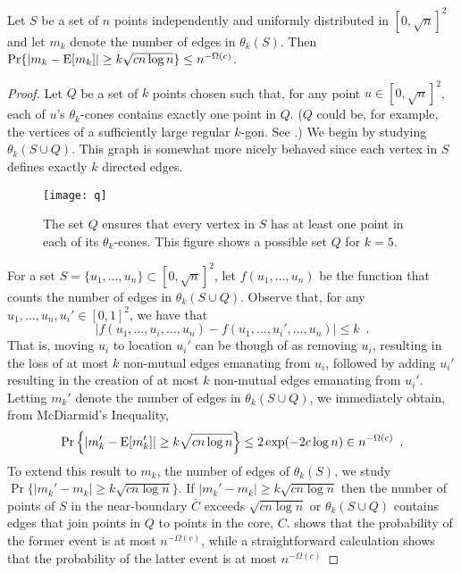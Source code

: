 \documentclass{patmorin}
\begin{document}
\begin{lem}
 Let $S$ be a set of $n$ points independently and uniformly distributed
 in $[0,\sqrt{n}]^2$ and let $m_k$ denote the number of edges in $\theta_k(S)$.
 Then $\Pr\{|m_k-\mathrm{E}[m_k]| \ge k\sqrt{cn\log n}\} \le n^{-\Omega(c)}$.
\end{lem}

\begin{proof}
Let $Q$ be a set of $k$ points chosen such that, for any point
$u\in[0,\sqrt{n}]^2$, each of $u$'s $\theta_k$-cones contains exactly
one point in $Q$. ($Q$ could be, for example, the vertices of a
sufficiently large regular $k$-gon. See .)  We begin by studying
$\theta_k(S\cup Q)$.  This graph is somewhat more nicely behaved since
each vertex in $S$ defines exactly $k$ directed edges.

\begin{figure}
  \begin{center}
    \texttt{[image: q]}
  \end{center}
  \caption{The set $Q$ ensures that every vertex in $S$ has at least
    one point in each of its $\theta_k$-cones.  This figure shows a
    possible set $Q$ for $k=5$.}
\end{figure}

For a set $S=\{u_1,\ldots,u_n\}\subset [0,\sqrt{n}]^2$, let
$f(u_1,\ldots,u_n)$ be the function that counts the number of edges
in $\theta_k(S\cup Q)$.  Observe that, for any $u_1,\ldots,u_n,u_i'\in
[0,1]^2$, we have that
\[
   |f(u_1,\ldots,u_i,\ldots,u_n)-f(u_1,\ldots,u_i',\ldots,u_n)| \le k \enspace .
\]
That is, moving $u_i$ to location $u_i'$ can be though of as removing
$u_i$, resulting in the loss of at most $k$ non-mutual edges emanating
from $u_i$, followed by adding $u_i'$ resulting in the creation of at
most $k$ non-mutual edges emanating from $u_i'$.  Letting $m_k'$ denote
the number of edges in $\theta_k(S\cup Q)$, we immediately obtain,
from McDiarmid's Inequality,
\[
   \Pr\left\{\left|m_k'-\mathrm{E}[m_k']\right| \ge k\sqrt{cn\log n}\right\} 
       \le 2\exp(-2c\log n) 
       \in n^{-\Omega(c)} \enspace .
\]
To extend this result to $m_k$, the number of edges of $\theta_k(S)$,
we study $\Pr\{|m_k' - m_k|\ge k\sqrt{cn\log n}\}$.  If $|m_k' -
m_k|\ge k\sqrt{cn\log n}$ then the number of points of $S$ in the
near-boundary $\bar{C}$ exceeds $\sqrt{cn\log n}$ or $\theta_k(S\cup
Q)$ contains edges that join points in $Q$ to points in the core, $C$.
 shows that the probability of the former event is at
most $n^{-\Omega(c)}$, while a straightforward calculation shows that
the probability of the latter event is at most $n^{-\Omega(c)}$
\end{proof}
\end{document}
